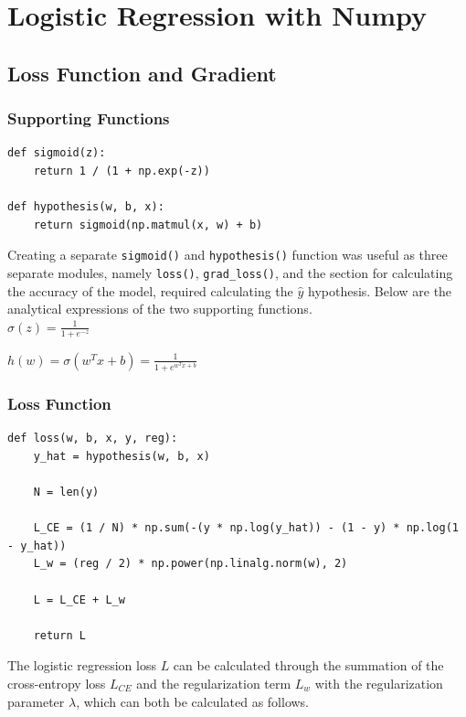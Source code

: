 \documentclass[letter]{article}
\begin{document}
\section{Logistic Regression with Numpy}

\subsection{Loss Function and Gradient}

\subsubsection{Supporting Functions}

\begin{lstlisting}
def sigmoid(z):
    return 1 / (1 + np.exp(-z))

def hypothesis(w, b, x):
    return sigmoid(np.matmul(x, w) + b)
\end{lstlisting}

Creating a separate \texttt{sigmoid()} and \texttt{hypothesis()} function was useful as three separate modules, namely \texttt{loss()}, \texttt{grad\_loss()}, and the section for calculating the accuracy of the model, required calculating the $\hat{y}$ hypothesis. Below are the analytical expressions of the two supporting functions.\\

$\sigma(z) = \frac{1}{1 + e^{-z}}$

$h(w) = \sigma(w^Tx + b) = \frac{1}{1 + e^{w^Tx + b}}$\\

\subsubsection{Loss Function}

\begin{lstlisting}
def loss(w, b, x, y, reg):
    y_hat = hypothesis(w, b, x)

    N = len(y)

    L_CE = (1 / N) * np.sum(-(y * np.log(y_hat)) - (1 - y) * np.log(1 - y_hat))
    L_w = (reg / 2) * np.power(np.linalg.norm(w), 2)
    
    L = L_CE + L_w

    return L
\end{lstlisting}

The logistic regression loss $L$ can be calculated through the summation of the cross-entropy loss $L_{CE}$ and the regularization term $L_{w}$ with the regularization parameter $\lambda$, which can both be calculated as follows.\\
\end{document}

